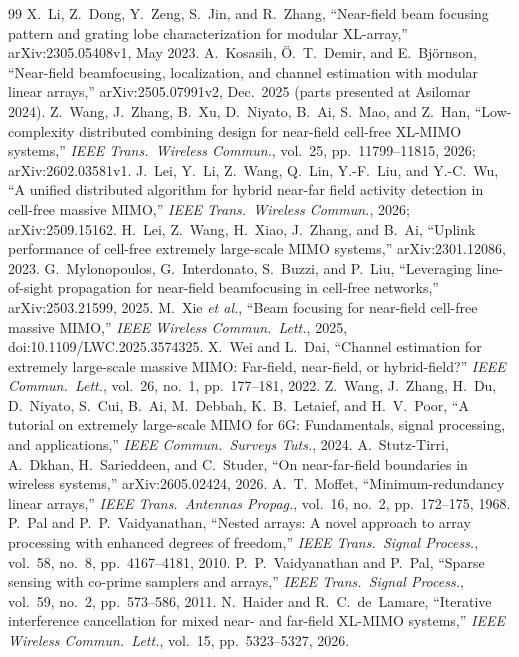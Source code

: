 \documentclass[11pt]{article}
\begin{document}
\begin{thebibliography}{99}
 X.~Li, Z.~Dong, Y.~Zeng, S.~Jin, and R.~Zhang, ``Near-field beam focusing pattern and grating lobe characterization for modular XL-array,'' arXiv:2305.05408v1, May 2023.
 A.~Kosasih, \"O.~T.~Demir, and E.~Bj\"ornson, ``Near-field beamfocusing, localization, and channel estimation with modular linear arrays,'' arXiv:2505.07991v2, Dec.\ 2025 (parts presented at Asilomar 2024).
 Z.~Wang, J.~Zhang, B.~Xu, D.~Niyato, B.~Ai, S.~Mao, and Z.~Han, ``Low-complexity distributed combining design for near-field cell-free XL-MIMO systems,'' \emph{IEEE Trans.\ Wireless Commun.}, vol.~25, pp.~11799--11815, 2026; arXiv:2602.03581v1.
 J.~Lei, Y.~Li, Z.~Wang, Q.~Lin, Y.-F.~Liu, and Y.-C.~Wu, ``A unified distributed algorithm for hybrid near-far field activity detection in cell-free massive MIMO,'' \emph{IEEE Trans.\ Wireless Commun.}, 2026; arXiv:2509.15162.
 H.~Lei, Z.~Wang, H.~Xiao, J.~Zhang, and B.~Ai, ``Uplink performance of cell-free extremely large-scale MIMO systems,'' arXiv:2301.12086, 2023.
 G.~Mylonopoulos, G.~Interdonato, S.~Buzzi, and P.~Liu, ``Leveraging line-of-sight propagation for near-field beamfocusing in cell-free networks,'' arXiv:2503.21599, 2025.
 M.~Xie \emph{et al.}, ``Beam focusing for near-field cell-free massive MIMO,'' \emph{IEEE Wireless Commun.\ Lett.}, 2025, doi:10.1109/LWC.2025.3574325.
 X.~Wei and L.~Dai, ``Channel estimation for extremely large-scale massive MIMO: Far-field, near-field, or hybrid-field?'' \emph{IEEE Commun.\ Lett.}, vol.~26, no.~1, pp.~177--181, 2022.
 Z.~Wang, J.~Zhang, H.~Du, D.~Niyato, S.~Cui, B.~Ai, M.~Debbah, K.~B.~Letaief, and H.~V.~Poor, ``A tutorial on extremely large-scale MIMO for 6G: Fundamentals, signal processing, and applications,'' \emph{IEEE Commun.\ Surveys Tuts.}, 2024.
 A.~Stutz-Tirri, A.~Dkhan, H.~Sarieddeen, and C.~Studer, ``On near-far-field boundaries in wireless systems,'' arXiv:2605.02424, 2026.
 A.~T.~Moffet, ``Minimum-redundancy linear arrays,'' \emph{IEEE Trans.\ Antennas Propag.}, vol.~16, no.~2, pp.~172--175, 1968.
 P.~Pal and P.~P.~Vaidyanathan, ``Nested arrays: A novel approach to array processing with enhanced degrees of freedom,'' \emph{IEEE Trans.\ Signal Process.}, vol.~58, no.~8, pp.~4167--4181, 2010.
 P.~P.~Vaidyanathan and P.~Pal, ``Sparse sensing with co-prime samplers and arrays,'' \emph{IEEE Trans.\ Signal Process.}, vol.~59, no.~2, pp.~573--586, 2011.
 N.~Haider and R.~C.~de~Lamare, ``Iterative interference cancellation for mixed near- and far-field XL-MIMO systems,'' \emph{IEEE Wireless Commun.\ Lett.}, vol.~15, pp.~5323--5327, 2026.
\end{thebibliography}
\end{document}

